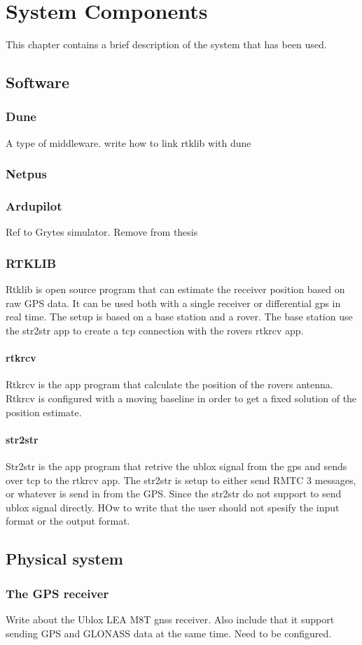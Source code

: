 
\chapter{System Components}
This chapter contains a brief description of the system that has been used.
\section{Software}
\subsection{Dune}
A type of middleware. write how to link rtklib with dune
\subsection{Netpus}
\subsection{Ardupilot}
Ref to Grytes simulator. Remove from thesis
\subsection{RTKLIB}
Rtklib is open source program that can estimate the receiver position based on raw GPS data. It can be used both with a single receiver or differential gps in real time. The setup is based on a base station and a rover. The base station use the str2str app to create a tcp connection with the rovers rtkrcv app.
\subsubsection{rtkrcv}
Rtkrcv is the app program that calculate the position of the rovers antenna. Rtkrcv is configured with a moving baseline in order to get a fixed solution of the position estimate.
\subsubsection{str2str}
Str2str is the app program that retrive the ublox signal from the gps and sends over tcp to the rtkrcv app. The str2str is setup to either send RMTC 3 messages, or whatever is send in from the GPS. Since the str2str do not support to send ublox signal directly. HOw to write that the user should not spesify the input format or the output format.
\section{Physical system}
\subsection{The GPS receiver}
Write about the Ublox LEA M8T gnss receiver. Also include that it support sending GPS and GLONASS data at the same time. Need to be configured.
\cleardoublepage